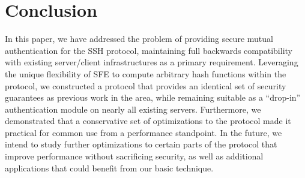 \section{Conclusion}

In this paper, we have addressed the problem of providing secure
mutual authentication for the SSH protocol, maintaining full backwards
compatibility with existing server/client infrastructures as a primary
requirement. Leveraging the unique flexibility of SFE to compute
arbitrary hash functions within the protocol, we constructed a
protocol that provides an identical set of security guarantees as
previous work in the area, while remaining suitable as a ``drop-in''
authentication module on nearly all existing servers. Furthermore, we
demonstrated that a conservative set of optimizations to the protocol
made it practical for common use from a performance standpoint. In the
future, we intend to study further optimizations to certain parts of
the protocol that improve performance without sacrificing security, as
well as additional applications that could benefit from our basic
technique.
